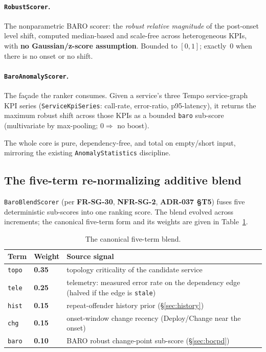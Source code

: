 \documentclass[11pt]{article}
\begin{document}
\paragraph{\texttt{RobustScorer}.}
The nonparametric BARO scorer: the \emph{robust relative magnitude} of the
post-onset level shift, computed median-based and scale-free across heterogeneous
KPIs, with \textbf{no Gaussian/z-score assumption}. Bounded to $[0,1]$; exactly~0
when there is no onset or no shift.

\paragraph{\texttt{BaroAnomalyScorer}.}
The fa\c{c}ade the ranker consumes. Given a service's three Tempo service-graph
KPI series (\texttt{ServiceKpiSeries}: call-rate, error-ratio, p95-latency), it
returns the maximum robust shift across those KPIs as a bounded \texttt{baro}
sub-score (multivariate by max-pooling; $0 \Rightarrow$ no boost).

The whole core is pure, dependency-free, and total on empty/short input,
mirroring the existing \texttt{AnomalyStatistics} discipline.

\subsection{The five-term re-normalizing additive blend}
\label{sec:blend}

\texttt{BaroBlendScorer} (per \textbf{FR-SG-30}, \textbf{NFR-SG-2}, \textbf{ADR-037
\S T5}) fuses five deterministic sub-scores into one ranking score. The blend
evolved across increments; the canonical five-term form and its weights are given
in Table~\ref{tab:blend}.

\begin{table}[ht]
\centering
\caption{The canonical five-term blend.}
\label{tab:blend}
\begin{tabular}{llp{8cm}}
\toprule
Term & Weight & Source signal \\
\midrule
\texttt{topo} & \textbf{0.35} & topology criticality of the candidate service \\
\texttt{tele} & \textbf{0.25} & telemetry: measured error rate on the dependency edge (halved if the edge is \texttt{stale}) \\
\texttt{hist} & \textbf{0.15} & repeat-offender history prior (\S\ref{sec:history}) \\
\texttt{chg}  & \textbf{0.15} & onset-window change recency (Deploy/Change near the onset) \\
\texttt{baro} & \textbf{0.10} & BARO robust change-point sub-score (\S\ref{sec:bocpd}) \\
\bottomrule
\end{tabular}
\end{table}
\end{document}
